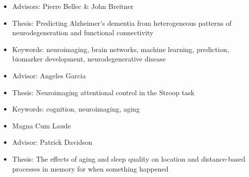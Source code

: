 \documentclass[10pt,a4paper,ragged2e,withhyper]{altacv}
\begin{document}
\begin{paracol}{2}




\switchcolumn


\begin{itemize}
    \item Advisors: Pierre Bellec \& John Breitner
    \item Thesis: Predicting Alzheimer's dementia from heterogeneous patterns of neurodegeneration and functional connectivity
    \item Keywords: neuroimaging, brain networks, machine learning, prediction, biomarker development, neurodegenerative disease
\end{itemize}

\divider

\begin{itemize}
    \item Advisor: Angeles Garcia
    \item Thesis: Neuroimaging attentional control in the Stroop task
    \item Keywords: cognition, neuroimaging, aging
\end{itemize}

\divider

\begin{itemize}
    \item Magna Cum Laude
    \item Advisor: Patrick Davidson
    \item Thesis: The effects of aging and sleep quality on location and distance-based processes in memory for when something happened
\end{itemize}


\end{paracol}
\end{document}
